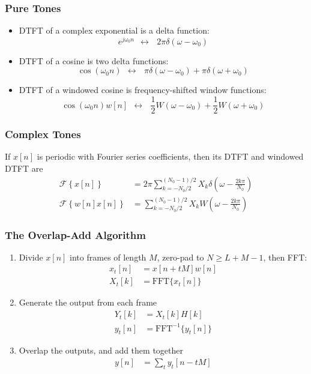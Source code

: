 \documentclass{beamer}
\begin{document}
\begin{frame}
  \frametitle{Pure Tones}

  \begin{itemize}
  \item DTFT of a complex exponential is a delta function:
    \begin{displaymath}
      e^{j\omega_0 n}~~\leftrightarrow~~~2\pi\delta(\omega-\omega_0)
    \end{displaymath}
  \item DTFT of a cosine is two delta functions:
    \begin{displaymath}
      \cos(\omega_0 n)~~\leftrightarrow~~~\pi\delta(\omega-\omega_0)+\pi\delta(\omega+\omega_0)
    \end{displaymath}
  \item DTFT of a windowed cosine is frequency-shifted window functions:
    \begin{displaymath}
      \cos(\omega_0 n)w[n]~~\leftrightarrow~~~\frac{1}{2}W(\omega-\omega_0)+\frac{1}{2}W(\omega+\omega_0)
    \end{displaymath}
  \end{itemize}
\end{frame}

\begin{frame}
  \frametitle{Complex Tones}
  If $x[n]$ is periodic with Fourier series coefficients, then its DTFT and windowed DTFT are
  \begin{align*}
    \mathcal{F}\left\{x[n]\right\}
    &=2\pi\sum_{k=-N_0/2}^{(N_0-1)/2} X_k \delta\left(\omega-\frac{2k\pi}{N_0}\right)\\
    \mathcal{F}\left\{w[n]x[n]\right\}
    &=\sum_{k=-N_0/2}^{(N_0-1)/2} X_k W\left(\omega-\frac{2k\pi}{N_0}\right)
  \end{align*}
\end{frame}

\begin{frame}
  \frametitle{The Overlap-Add Algorithm}

  \begin{enumerate}
  \item Divide $x[n]$ into frames of length $M$, zero-pad to $N\ge L+M-1$, then FFT:
    \begin{align*}
      x_t[n] &= x[n+tM]w[n]\\
      X_t[k] &= \text{FFT}\{x_t[n]\}
    \end{align*}
  \item Generate the output from each frame
    \begin{align*}
      Y_t[k] &= X_t[k]H[k]\\
      y_t[n] &= \text{FFT}^{-1}\{y_t[n]\}
    \end{align*}
  \item  Overlap the outputs, and add them together
    \begin{align*}
      y[n] &= \sum_t y_t[n-tM]
    \end{align*}
  \end{enumerate}
\end{frame}
\end{document}
